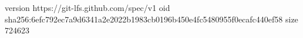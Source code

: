 version https://git-lfs.github.com/spec/v1
oid sha256:6efc792ec7a9d6341a2e2022b1983cb0196b450e4fc5480955f0ecafc440ef58
size 724623
